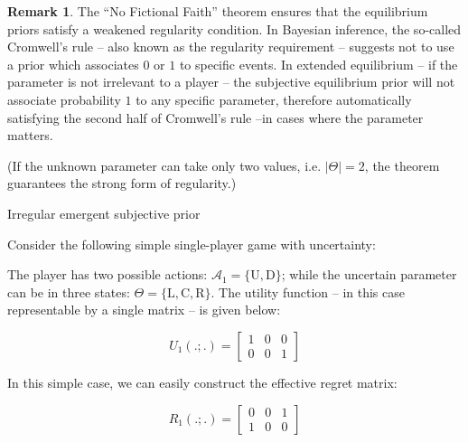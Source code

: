 \documentclass{beamer}
\theoremstyle{definition}
\newtheorem*{remark}{Remark}
\begin{document}
\begin{frame}{}

    \begin{remark}
    The ``No Fictional Faith'' theorem ensures that the equilibrium priors satisfy a weakened regularity condition. In Bayesian inference,
    the so-called Cromwell's rule -- also known as the regularity requirement -- suggests not to use a prior which associates $0$ or $1$ to specific events.
    In extended equilibrium -- if the parameter is not irrelevant to a player -- the subjective equilibrium prior will not associate probability $1$ to any specific parameter, therefore automatically satisfying the second half of Cromwell's rule --in cases where the parameter matters.

    (If the unknown parameter can take only two values, i.e. $|\Theta|=2$, the theorem guarantees the strong form of regularity.)
    
\end{remark}
\end{frame}

\begin{frame}{Irregular emergent subjective prior}
    
    Consider the following simple single-player game with uncertainty:

    The player has two possible actions: $\mathcal{A_1} = \{\mathrm{U},\mathrm{D}\}$; while the uncertain parameter can be in three states: $\Theta=\{\mathrm{L},\mathrm{C},\mathrm{R}\}$.
    The utility function -- in this case representable by a single matrix -- is given below:

    \begin{equation}
        U_1(.;.) = 
        \begin{bmatrix}
            1 & 0 & 0 \\
            0 & 0 & 1
        \end{bmatrix}
    \end{equation}

    In this simple case, we can easily construct the effective regret matrix:

    \begin{equation}
        R_1(.;.) = 
        \begin{bmatrix}
            0 & 0 & 1 \\
            1 & 0 & 0
        \end{bmatrix}
    \end{equation}

\end{frame}
\end{document}
